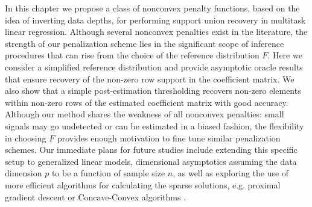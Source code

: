In this chapter we propose a class of nonconvex penalty functions, based on the idea of inverting data depths, for performing support union recovery in multitask linear regression. Although several nonconvex penalties exist in the literature, the strength of our penalization scheme lies in the significant scope of inference procedures that can rise from the choice of the reference distribution $F$. Here we consider a simplified reference distribution and provide asymptotic oracle results that ensure recovery of the non-zero row support in the coefficient matrix. We also show that a simple post-estimation thresholding recovers non-zero elements within non-zero rows of the estimated coefficient matrix with good accuracy. Although our method shares the weakness of all nonconvex penalties: small signals may go undetected or can be estimated in a biased fashion, the flexibility in choosing $F$ provides enough motivation to fine tune similar penalization schemes. Our immediate plans for future studies include extending this specific setup to generalized linear models, dimensional asymptotics assuming the data dimension $p$ to be a function of sample size $n$, as well as exploring the use of more efficient algorithms for calculating the sparse solutions, e.g. proximal gradient descent or Concave-Convex algorithms \citep{WangKimLi13}.
